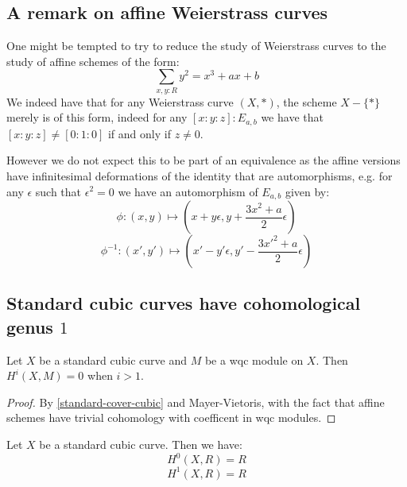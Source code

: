 \subsection{A remark on affine Weierstrass curves}

One might be tempted to try to reduce the study of Weierstrass curves to the study of affine schemes of the form:
\[ \sum_{x,y:R} y^2 = x^3 + ax + b\]
We indeed have that for any Weierstrass curve $(X,*)$, the scheme $X - \{*\}$ merely is of this form, indeed for any $[x:y:z] : E_{a,b}$ we have that $[x:y:z]\not=[0:1:0]$ if and only if $z\not=0$. 

However we do not expect this to be part of an equivalence as the affine versions have infinitesimal deformations of the identity that are automorphisms, e.g. for any $\epsilon$ such that $\epsilon^2=0$ we have an automorphism of $E_{a,b}$ given by:
\[\phi : (x,y) \mapsto (x+y\epsilon , y+ \frac{3x^2 + a}{2} \epsilon)\]
\[\phi^{-1} : (x',y') \mapsto (x'-y'\epsilon , y'- \frac{3{x'}^2 + a}{2} \epsilon)\]

\subsection{Standard cubic curves have cohomological genus $1$}

\begin{lemma}
Let $X$ be a standard cubic curve and $M$ be a wqc module on $X$. Then $H^i(X,M) = 0$ when $i>1$.
\end{lemma}

\begin{proof}
By \cref{standard-cover-cubic} and Mayer-Vietoris, with the fact that affine schemes have trivial cohomology with coefficent in wqc modules.
\end{proof}

\begin{lemma}\label{cohomology-weierstrass-curve-0-1}
Let $X$ be a standard cubic curve. Then we have:
\[H^0(X,R) = R\]
\[H^1(X,R) = R\]
\end{lemma}

